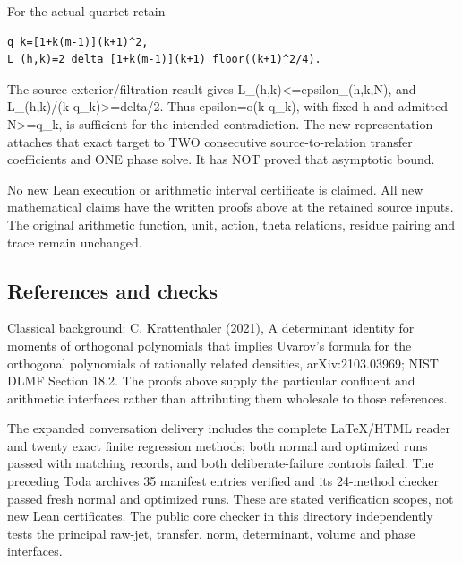 For the actual quartet retain

\begin{Verbatim}[breaklines=true,breakanywhere=true,fontsize=\small]
q_k=[1+k(m-1)](k+1)^2,
L_(h,k)=2 delta [1+k(m-1)](k+1) floor((k+1)^2/4).
\end{Verbatim}

The source exterior/filtration result gives
L\_(h,k)\textless=epsilon\_(h,k,N), and L\_(h,k)/(k
q\_k)\textgreater=delta/2. Thus epsilon=o(k q\_k), with fixed h and
admitted N\textgreater=q\_k, is sufficient for the intended
contradiction. The new representation attaches that exact target to TWO
consecutive source-to-relation transfer coefficients and ONE phase
solve. It has NOT proved that asymptotic bound.

No new Lean execution or arithmetic interval certificate is claimed. All
new mathematical claims have the written proofs above at the retained
source inputs. The original arithmetic function, unit, action, theta
relations, residue pairing and trace remain unchanged.

\subsection[\hspace{0.4em}References and
checks]{References and
checks}\label{confluent-transfer-references-and-checks}

Classical background: C. Krattenthaler (2021), \textquotesingle A
determinant identity for moments of orthogonal polynomials that implies
Uvarov's formula for the orthogonal polynomials of rationally related
densities\textquotesingle, arXiv:2103.03969; NIST DLMF Section 18.2. The
proofs above supply the particular confluent and arithmetic interfaces
rather than attributing them wholesale to those references.

The expanded conversation delivery includes the complete LaTeX/HTML
reader and twenty exact finite regression methods; both normal and
optimized runs passed with matching records, and both deliberate-failure
controls failed. The preceding Toda archive\textquotesingle s 35
manifest entries verified and its 24-method checker passed fresh normal
and optimized runs. These are stated verification scopes, not new Lean
certificates. The public core checker in this directory independently
tests the principal raw-jet, transfer, norm, determinant, volume and
phase interfaces.

\endgroup
